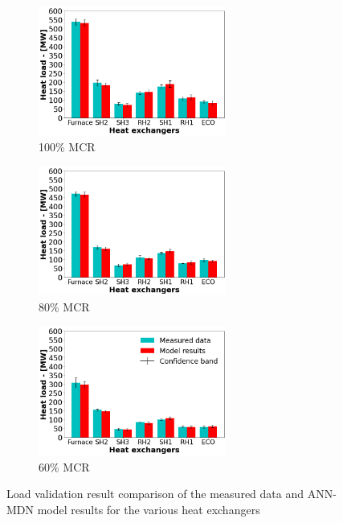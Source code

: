 \documentclass[a4paper,fleqn]{cas-dc}
\begin{document}
\begin{figure}
\centering
\begin{subfigure}{0.33\textwidth}
    \includegraphics[width=\textwidth, height = 4.25cm]{100_CASE}
    \caption{100\% MCR}
\end{subfigure}\hfill %
\begin{subfigure}{0.33\textwidth}
    \includegraphics[width=\linewidth, height = 4.25cm]{80_CASE}
    \caption{80\% MCR}
\end{subfigure}\hfill
\begin{subfigure}{0.33\textwidth}
	\includegraphics[width=\linewidth, height = 4.25cm]{60_CASE}
        \caption{60\% MCR}
\end{subfigure}
\caption{Load validation result comparison of the measured data and ANN-MDN model results for the various heat exchangers}
\label{fig_heat_load}
\end{figure}
\end{document}
